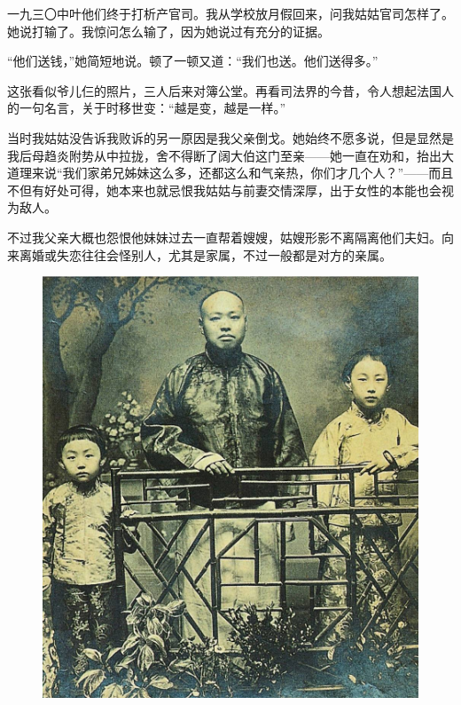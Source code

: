 \par 一九三〇中叶他们终于打析产官司。我从学校放月假回来，问我姑姑官司怎样了。她说打输了。我惊问怎么输了，因为她说过有充分的证据。
\par “他们送钱，”她简短地说。顿了一顿又道：“我们也送。他们送得多。”
\par 这张看似爷儿仨的照片，三人后来对簿公堂。再看司法界的今昔，令人想起法国人的一句名言，关于时移世变：“越是变，越是一样。”
\par 当时我姑姑没告诉我败诉的另一原因是我父亲倒戈。她始终不愿多说，但是显然是我后母趋炎附势从中拉拢，舍不得断了阔大伯这门至亲——她一直在劝和，抬出大道理来说“我们家弟兄姊妹这么多，还都这么和气亲热，你们才几个人？”——而且不但有好处可得，她本来也就忌恨我姑姑与前妻交情深厚，出于女性的本能也会视为敌人。
\par 不过我父亲大概也怨恨他妹妹过去一直帮着嫂嫂，姑嫂形影不离隔离他们夫妇。向来离婚或失恋往往会怪别人，尤其是家属，不过一般都是对方的亲属。
\begin{figure}[htb]
    \centering %
    \includegraphics[scale=0.4]{picture/对照记24.jpeg}
\end{figure}

